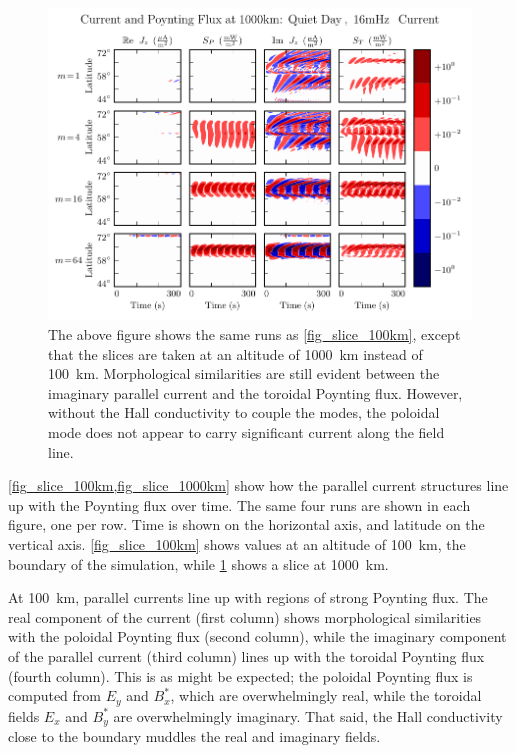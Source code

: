 \begin{figure}[!htb]
    \centering
    \includegraphics[width=\textwidth]{figures/slice_1000km.pdf}
    \caption[Current and Poynting Flux at \SI{1000}{\km}]{
      The above figure shows the same runs as \cref{fig_slice_100km}, except that the slices are taken at an altitude of \SI{1000}{\km} instead of \SI{100}{\km}. Morphological similarities are still evident between the imaginary parallel current and the toroidal Poynting flux. However, without the Hall conductivity to couple the modes, the poloidal mode does not appear to carry significant current along the field line. 
    }
    \label{fig_slice_1000km}
\end{figure}

\cref{fig_slice_100km,fig_slice_1000km} show how the parallel current structures line up with the Poynting flux over time. The same four runs are shown in each figure, one per row. Time is shown on the horizontal axis, and latitude on the vertical axis. \cref{fig_slice_100km} shows values at an altitude of \SI{100}{\km}, the boundary of the simulation, while \cref{fig_slice_1000km} shows a slice at \SI{1000}{\km}. 

At \SI{100}{\km}, parallel currents line up with regions of strong Poynting flux. The real component of the current (first column) shows morphological similarities with the poloidal Poynting flux (second column), while the imaginary component of the parallel current (third column) lines up with the toroidal Poynting flux (fourth column). This is as might be expected; the poloidal Poynting flux is computed from $E_y$ and $B_x^*$, which are overwhelmingly real, while the toroidal fields $E_x$ and $B_y^*$ are overwhelmingly imaginary. That said, the Hall conductivity close to the boundary muddles the real and imaginary fields. 

